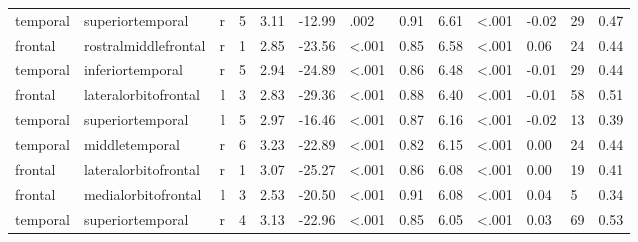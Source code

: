 \documentclass{article}
\begin{document}
\begin{longtable}{llrR{1.3cm}R{1cm}R{1.3cm}R{1cm}R{1cm}R{1.3cm}R{1cm}R{1.8cm}R{1.3cm}R{1.8cm}}
  temporal &          superiortemporal &    r &         5 &                  3.11 &           -12.99 &               .002 &                               0.91 &                          6.61 &                   \textless.001 &  -0.02 &     29 &      0.47 \\
   frontal &      rostralmiddlefrontal &    r &         1 &                  2.85 &           -23.56 &      \textless.001 &                               0.85 &                          6.58 &                   \textless.001 &   0.06 &     24 &      0.44 \\
  temporal &          inferiortemporal &    r &         5 &                  2.94 &           -24.89 &      \textless.001 &                               0.86 &                          6.48 &                   \textless.001 &  -0.01 &     29 &      0.44 \\
   frontal &      lateralorbitofrontal &    l &         3 &                  2.83 &           -29.36 &      \textless.001 &                               0.88 &                          6.40 &                   \textless.001 &  -0.01 &     58 &      0.51 \\
  temporal &          superiortemporal &    l &         5 &                  2.97 &           -16.46 &      \textless.001 &                               0.87 &                          6.16 &                   \textless.001 &  -0.02 &     13 &      0.39 \\
  temporal &            middletemporal &    r &         6 &                  3.23 &           -22.89 &      \textless.001 &                               0.82 &                          6.15 &                   \textless.001 &   0.00 &     24 &      0.44 \\
   frontal &      lateralorbitofrontal &    r &         1 &                  3.07 &           -25.27 &      \textless.001 &                               0.86 &                          6.08 &                   \textless.001 &   0.00 &     19 &      0.41 \\
   frontal &       medialorbitofrontal &    l &         3 &                  2.53 &           -20.50 &      \textless.001 &                               0.91 &                          6.08 &                   \textless.001 &   0.04 &      5 &      0.34 \\
  temporal &          superiortemporal &    r &         4 &                  3.13 &           -22.96 &      \textless.001 &                               0.85 &                          6.05 &                   \textless.001 &   0.03 &     69 &      0.53 \\

\end{longtable}
\end{document}
